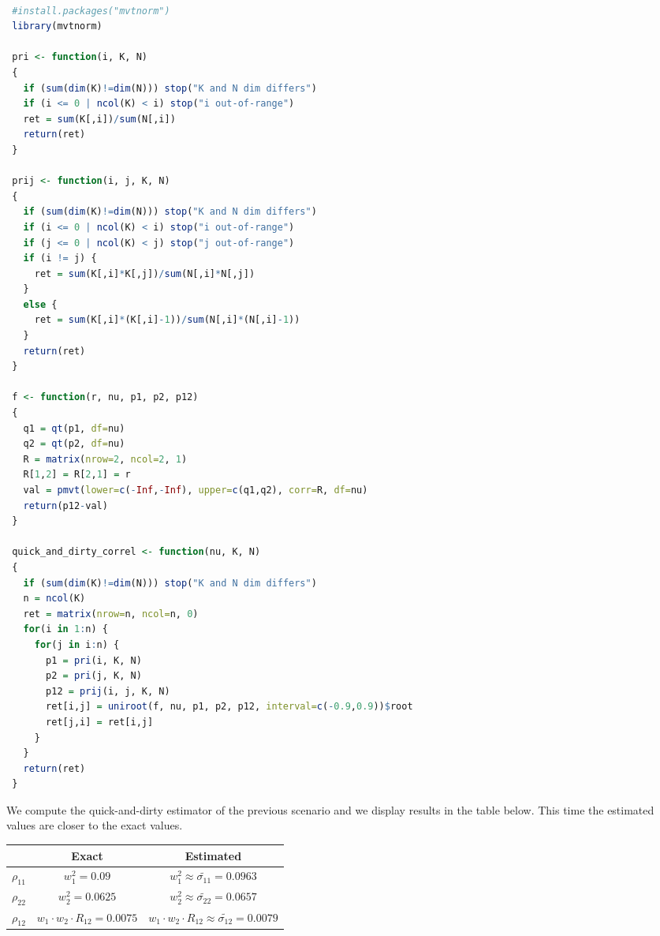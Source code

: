\documentclass[11pt,fleqn]{book} %
\begin{document}
\begin{lstlisting}[language=R, label=sc:qadc, caption=Quick-and-dirty correlation (R script)]

 #install.packages("mvtnorm")
 library(mvtnorm)

 pri <- function(i, K, N)
 {
   if (sum(dim(K)!=dim(N))) stop("K and N dim differs")
   if (i <= 0 | ncol(K) < i) stop("i out-of-range")
   ret = sum(K[,i])/sum(N[,i])
   return(ret)
 }

 prij <- function(i, j, K, N)
 {
   if (sum(dim(K)!=dim(N))) stop("K and N dim differs")
   if (i <= 0 | ncol(K) < i) stop("i out-of-range")
   if (j <= 0 | ncol(K) < j) stop("j out-of-range")
   if (i != j) {
     ret = sum(K[,i]*K[,j])/sum(N[,i]*N[,j])
   }
   else {
     ret = sum(K[,i]*(K[,i]-1))/sum(N[,i]*(N[,i]-1))
   }
   return(ret)
 }

 f <- function(r, nu, p1, p2, p12)
 {
   q1 = qt(p1, df=nu)
   q2 = qt(p2, df=nu)
   R = matrix(nrow=2, ncol=2, 1)
   R[1,2] = R[2,1] = r
   val = pmvt(lower=c(-Inf,-Inf), upper=c(q1,q2), corr=R, df=nu)
   return(p12-val)
 }

 quick_and_dirty_correl <- function(nu, K, N)
 {
   if (sum(dim(K)!=dim(N))) stop("K and N dim differs")
   n = ncol(K)
   ret = matrix(nrow=n, ncol=n, 0)
   for(i in 1:n) {
     for(j in i:n) {
       p1 = pri(i, K, N)
       p2 = pri(j, K, N)
       p12 = prij(i, j, K, N)
       ret[i,j] = uniroot(f, nu, p1, p2, p12, interval=c(-0.9,0.9))$root
       ret[j,i] = ret[i,j]
     }
   }
   return(ret)
 }

\end{lstlisting}

We compute the quick-and-dirty estimator of the previous scenario and we display
results in the table below. This time the estimated values are closer 
to the exact values.

\hspace*{1cm}
\begin{tabular}{c|c|c|}
	\cline{2-3}
	& Exact & Estimated \\
	\hline
	\multicolumn{1}{|c|}{$\rho_{11}$} & $w_1^2 = 0.09$ & $w_1^2 \approx \widetilde{\sigma_{11}} = 0.0963$ \\
	\hline
	\multicolumn{1}{|c|}{$\rho_{22}$} & $w_2^2 = 0.0625$ & $w_2^2 \approx \widetilde{\sigma_{22}} = 0.0657$ \\
	\hline
	\multicolumn{1}{|c|}{$\rho_{12}$} & $w_1 \cdot w_2 \cdot R_{12} = 0.0075$ & $w_1 \cdot w_2 \cdot R_{12} \approx \widetilde{\sigma_{12}} = 0.0079$ \\
	\hline
\end{tabular}
\ \\
\end{document}
